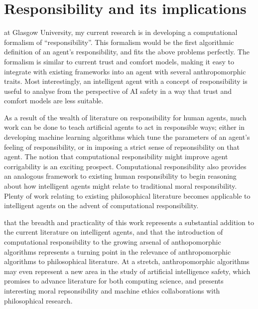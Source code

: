 
\section{Responsibility and its implications}
 at Glasgow University, my current research is in developing a computational formalism of ``responsibility''. This formalism would be the first algorithmic definition of an agent's responsibility, and fits the above problems perfectly. The formalism is similar to current trust and comfort models, making it easy to integrate with existing frameworks into an agent with several anthropomorphic traits. Most interestingly, an intelligent agent with a concept of responsibility is useful to analyse from the perspective of AI safety in a way that trust and comfort models are less suitable.\par

As a result of the wealth of literature on responsibility for human agents, much work can be done to teach artificial agents to act in responsible ways; either in developing machine learning algorithms which tune the parameters of an agent's feeling of responsibility, or in imposing a strict sense of repsonsibility on that agent. The notion that computational responsibility might improve agent corrigability\cite{corrigability} is an exciting prospect. Computational responsibility also provides an analogous framework to existing human responsibility to begin reasoning about how intelligent agents might relate to traditional moral responsibility. Plenty of work relating to existing philosophical literature becomes applicable to intelligent agents on the advent of computational responsibility.\par

 that the breadth and practicality of this work represents a substantial addition to the current literature on intelligent agents, and that the introduction of computational responsibility to the growing arsenal of anthopomorphic algorithms represents a turning point in the relevance of anthropomorphic algorithms to philosophical literature. At a stretch, anthropomorphic algorithms may even represent a new area in the study of artificial intelligence safety, which promises to advance literature for both computing science, and presents interesting moral repsonsibility and machine ethics collaborations with philosophical research.

